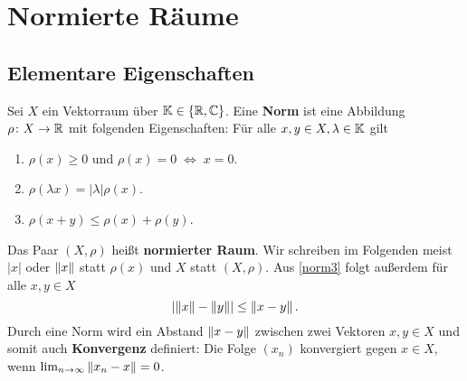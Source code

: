 \section{Normierte Räume}
\subsection{Elementare Eigenschaften}
Sei $X$ ein Vektorraum über $\mathbb{K} \in \{\mathbb{R}, \mathbb{C}\}$. Eine \textbf{Norm} ist eine Abbildung $\rho \colon X \to \mathbb{R}$ mit folgenden Eigenschaften: Für alle $x,y \in X, \lambda \in \mathbb{K}$ gilt
\begin{enumerate}[label={\bfseries(N\arabic*)}]
	\item $\rho(x) \geq 0$ und $\rho(x) = 0 \;\Leftrightarrow\; x = 0$.
	\item $\rho(\lambda x) = |\lambda| \rho(x)$.
	\item\label{norm3} $\rho(x+y) \leq \rho(x) + \rho(y)$.
\end{enumerate}
Das Paar $(X, \rho)$ heißt \textbf{normierter Raum}. Wir schreiben im Folgenden meist $|x|$ oder $\left\lVert x\right\rVert$ statt $\rho(x)$ und $X$ statt $(X,\rho)$. Aus \ref{norm3} folgt außerdem für alle $x,y \in X$
\[\left|\left\lVert x\right\rVert - \left\lVert y\right\rVert\right| \leq \left\lVert x-y\right\rVert.\]
Durch eine Norm wird ein Abstand $\left\lVert x-y\right\rVert$ zwischen zwei Vektoren $x,y \in X$ und somit auch \textbf{Konvergenz} definiert: Die Folge $(x_n)$ konvergiert gegen $x \in X$, wenn $\lim_{n \to \infty} \left\lVert x_n-x\right\rVert = 0$.

